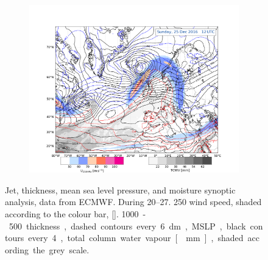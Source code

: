 \begin{figure}[h!]
\begin{subfigure}[b]{0.49\textwidth}
		\caption{}\label{fig:GP23}
	\end{subfigure}
    \begin{subfigure}[b]{\textwidth}
        \includegraphics[trim={4.2cm 0cm 4.3cm 36.8cm},clip,
        width=\textwidth]{./fig_Geopot_Jet/20161225_12}
    \end{subfigure}
\caption{Jet, thickness, mean sea level pressure, and moisture synoptic analysis, data from ECMWF. During \SIrange{20}{27}{\dec}. \SI{250}{\hPa} wind speed, shaded according to the colour bar, [\SI{}{\mPs}]. \SI{1000}-\SI{500}{\hPa} thickness, dashed contours every \SI{6}{\deca\meter}, MSLP, black contours every \SI{4}{\hPa}, total column water vapour [\SI{}{\mm}], shaded according the grey scale.}\label{fig:GeopJet}
\end{figure}

